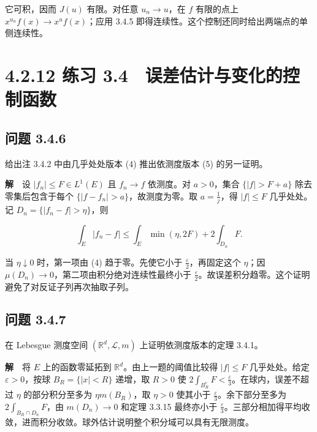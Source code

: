 \documentclass[11pt,a4paper]{article}
\begin{document}
它可积，因而 \(J(u)\) 有限。对任意 \(u_n\to u\)，在 \(f\) 有限的点上
\(x^{u_n}f(x)\to x^uf(x)\)；应用 3.4.5
即得连续性。这个控制还同时给出两端点的单侧连续性。

\clearpage\section[\S{}4.2.12 练习
3.4　误差估计与变化的控制函数]{4.2.12 练习
3.4　误差估计与变化的控制函数}\label{ux7ec3ux4e60-3.4-ux8befux5deeux4f30ux8ba1ux4e0eux53d8ux5316ux7684ux63a7ux5236ux51fdux6570}

\subsection{问题 3.4.6}\label{ux95eeux9898-3.4.6}

给出注 3.4.2 中由几乎处处版本 (4) 推出依测度版本 (5) 的另一证明。

\textbf{解}　设 \(|f_n|\le F\in L^1(E)\) 且 \(f_n\to f\) 依测度。对
\(a>0\)，集合 \(\{|f|>F+a\}\) 除去零集后包含于每个
\(\{|f-f_n|>a\}\)，故测度为零。取 \(a=\frac{1}{j}\)，得 \(|f|\le F\)
几乎处处。记 \(D_n=\{|f_n-f|>\eta\}\)，则

\begin{equation*}
\int_E|f_n-f|\le\int_E\min(\eta,2F)+2\int_{D_n}F .
\end{equation*}

当 \(\eta\downarrow0\) 时，第一项由 (4) 趋于零。先使它小于
\(\frac{\varepsilon}{2}\)，再固定这个 \(\eta\)；因
\(\mu(D_n)\to0\)，第二项由积分绝对连续性最终小于
\(\frac{\varepsilon}{2}\)。故误差积分趋零。这个证明避免了对反证子列再次抽取子列。

\subsection{问题 3.4.7}\label{ux95eeux9898-3.4.7}

在 Lebesgue 测度空间 \((\mathbb R^d,\mathcal L,m)\)
上证明依测度版本的定理 3.4.1。

\textbf{解}　将 \(E\) 上的函数零延拓到
\(\mathbb R^d\)。由上一题的阈值比较得 \(|f|\le F\) 几乎处处。给定
\(\varepsilon>0\)，按球 \(B_R=\{|x|<R\}\) 递增，取 \(R>0\) 使
\(2\int_{B_R^c}F<\frac{\varepsilon}{3}\)。在球内，误差不超过 \(\eta\)
的部分积分至多为 \(\eta m(B_R)\)，取 \(\eta>0\) 使其小于
\(\frac{\varepsilon}{3}\)。余下部分至多为 \(2\int_{B_R\cap D_n} F\)，由
\(m(D_n)\to0\) 和定理 3.3.15 最终亦小于
\(\frac{\varepsilon}{3}\)。三部分相加得平均收敛，进而积分收敛。球外估计说明整个积分域可以具有无限测度。
\end{document}
